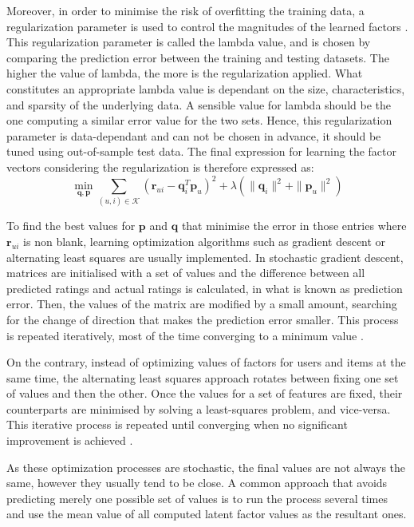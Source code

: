 Moreover, in order to minimise the risk of overfitting the training data, a regularization parameter is used to control the magnitudes of the learned factors \autocite{bell07scalable}.
This regularization parameter is called the lambda value, and is chosen by comparing the prediction error between the training and testing datasets. The higher the value of lambda, the more is the regularization applied. What constitutes an appropriate lambda value is dependant on the size, characteristics, and sparsity of the underlying data. A sensible value for lambda should be the one computing a similar error value for the two sets. Hence, this regularization parameter is data-dependant and can not be chosen in advance, it should be tuned using out-of-sample test data.
The final expression for learning the factor vectors considering the regularization is therefore expressed as:
\begin{equation}
\min_{\boldsymbol{q}, \boldsymbol{p}} 
\displaystyle\sum_{(u,i) \in \mathcal{K}} 
(\boldsymbol{r}_{ui} - \boldsymbol{q}_{i}^T \boldsymbol{p}_u)^2 
+ \lambda(\|\boldsymbol{q}_i\|^2 + \| \boldsymbol{p}_u \|^2)
\end{equation}




To find the best values for $\boldsymbol{p}$ and $\boldsymbol{q}$ that minimise the error in those  entries where $\boldsymbol{r}_{ui}$ is non blank, learning optimization algorithms such as gradient descent or alternating least squares are usually implemented. 
In stochastic gradient descent, matrices are initialised with a set of values and the difference between all predicted ratings and actual ratings is calculated, in what is known as prediction error. Then, the values of the matrix are modified by a small amount, searching for the change of direction that makes the prediction error smaller. This process is repeated iteratively,  most of the time converging to a minimum value \autocite{funk06netflix}.

On the contrary, instead of optimizing values of factors for users and items at the same time, the alternating least squares approach rotates between fixing one set of values and then the other. Once the values for a set of features are fixed, their counterparts are minimised by solving a least-squares problem, and vice-versa. This iterative process is repeated until converging when no significant improvement is achieved \autocite{bell07modeling}.

As these optimization processes are stochastic, the final values are not always the same, however they usually tend to be close. A common approach that avoids predicting merely one possible set of values is to run the process several times and use the mean value of all computed latent factor values as the resultant ones.












